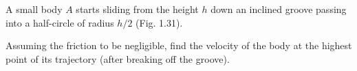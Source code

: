 \item A small body $A$ starts sliding from the height $h$ down an inclined groove passing into a half-circle of radius $h/2$ (Fig. 1.31).
    \begin{center}
    \end{center}
    Assuming the friction to be negligible, find the velocity of the body at the highest point of its trajectory (after breaking off the groove).
\begin{solution}
    \begin{center}
    \end{center}
    

\end{solution}
